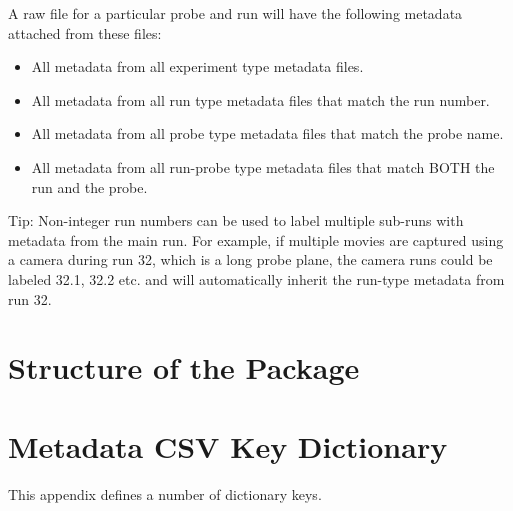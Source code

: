 \documentclass[12pt]{article}
\newcommand{\todo}[1]{ \begin{tcolorbox} \centering  #1 \end{tcolorbox}}
\begin{document}
A raw file for a particular probe and run will have the following metadata attached from these files:

\begin{itemize}
\item All metadata from all experiment type metadata files.

\item All metadata from all run type metadata files that match the run number.

\item All metadata from all probe type metadata files that match the probe name.

\item All metadata from all run-probe type metadata files that match BOTH the run and the probe.
\end{itemize}


\todo{Tip: Non-integer run numbers can be used to label multiple sub-runs with metadata from the main run. For example, if multiple movies are captured using a camera during run 32, which is a long probe plane, the camera runs could be labeled 32.1, 32.2 etc. and will automatically inherit the run-type metadata from run 32.}



\section{Structure of the Package}


\appendix 

\section{Metadata CSV Key Dictionary}
This appendix defines a number of dictionary keys.

\end{document}
